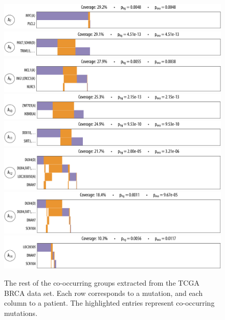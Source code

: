 \begin{figure}[htbp]
\centering
\includegraphics[width=\textwidth]{figures/genes/brca_9_a.pdf}\\[1.2em]
\includegraphics[width=\textwidth]{figures/genes/brca_13_a.pdf}\\[1.2em]
\includegraphics[width=\textwidth]{figures/genes/brca_5_a.pdf}\\[1.2em]
\includegraphics[width=\textwidth]{figures/genes/brca_10_a.pdf}\\[1.2em]
\includegraphics[width=\textwidth]{figures/genes/brca_12_a.pdf}\\[1.2em]
\includegraphics[width=\textwidth]{figures/genes/brca_3_a.pdf}\\[1.2em]
\includegraphics[width=\textwidth]{figures/genes/brca_2_a.pdf}\\[1.2em]
\includegraphics[width=\textwidth]{figures/genes/brca_6_a.pdf}\\[1.2em]
\caption{The rest of the co-occurring groups extracted from the TCGA BRCA data set.
Each row corresponds to a mutation, and each column to a patient.
The highlighted entries represent co-occurring mutations.}
\label{fig:att_brca_2}
\end{figure}